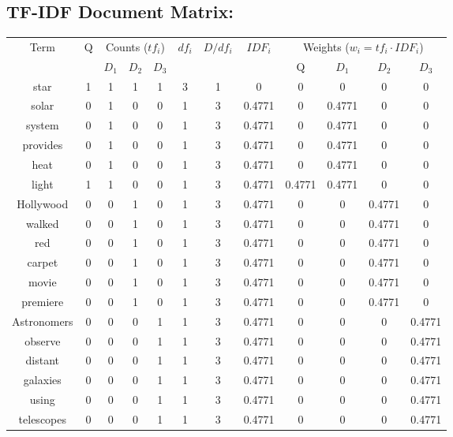 \documentclass{article}
\begin{document}
\subsection{TF-IDF Document Matrix:}
\begin{table}[H]
\centering
\small
\begin{tabular}{|c|c|ccc|c|c|c|c|ccc|}
\hline
\multirow{2}{*}{Term} & \multirow{2}{*}{Q} & \multicolumn{3}{c|}{Counts ($tf_i$)} & \multirow{2}{*}{$df_i$} & \multirow{2}{*}{$D/df_i$} & \multirow{2}{*}{$IDF_i$} & \multicolumn{4}{c|}{Weights ($w_i = tf_i \cdot IDF_i$)} \\
\cline{3-5} \cline{9-12}
 &  & $D_1$ & $D_2$ & $D_3$ &  &  &  & Q & $D_1$ & $D_2$ & $D_3$ \\
\hline
star         & 1 & 1 & 1 & 1 & 3 & 1   & 0      & 0      & 0      & 0      & 0 \\
solar        & 0 & 1 & 0 & 0 & 1 & 3 & 0.4771 & 0      & 0.4771      & 0 & 0 \\
system       & 0 & 1 & 0 & 0 & 1 & 3   & 0.4771 & 0      & 0.4771 & 0      & 0 \\
provides     & 0 & 1 & 0 & 0 & 1 & 3   & 0.4771 & 0      & 0.4771 & 0 & 0 \\
heat         & 0 & 1 & 0 & 0 & 1 & 3   & 0.4771 & 0      & 0.4771 & 0      & 0 \\
light        & 1 & 1 & 0 & 0 & 1 & 3 & 0.4771 & 0.4771 & 0.4771 & 0      & 0 \\
Hollywood    & 0 & 0 & 1 & 0 & 1 & 3   & 0.4771      & 0      & 0      & 0.4771     & 0 \\
walked       & 0 & 0 & 1 & 0 & 1 & 3   & 0.4771 & 0 & 0      & 0.4771 & 0 \\
red          & 0 & 0 & 1 & 0 & 1 & 3 & 0.4771 & 0      & 0 & 0.4771      & 0 \\
carpet       & 0 & 0 & 1 & 0 & 1 & 3 & 0.4771 & 0 & 0      & 0.4771 & 0 \\
movie        & 0 & 0 & 1 & 0 & 1 & 3 & 0.4771 & 0 & 0      & 0.4771 & 0 \\
premiere     & 0 & 0 & 1 & 0 & 1 & 3 & 0.4771 & 0 & 0      & 0.4771 & 0 \\
Astronomers  & 0 & 0 & 0 & 1 & 1 & 3 & 0.4771 & 0 & 0    & 0   & 0.4771 \\
observe      & 0 & 0 & 0 & 1 & 1 & 3 & 0.4771 & 0 & 0   & 0    & 0.4771  \\
distant      & 0 & 0 & 0 & 1 & 1 & 3 & 0.4771 & 0 & 0      & 0 & 0.4771  \\
galaxies     & 0 & 0 & 0 & 1 & 1 & 3 & 0.4771 & 0 & 0      & 0 & 0.4771 \\
using        & 0 & 0 & 0 & 1 & 1 & 3 & 0.4771 & 0 & 0      & 0 & 0.4771 \\
telescopes   & 0 & 0 & 0 & 1 & 1 & 3 & 0.4771 & 0 & 0      & 0 & 0.4771 \\
\hline
\end{tabular}
\end{table}
\end{document}
